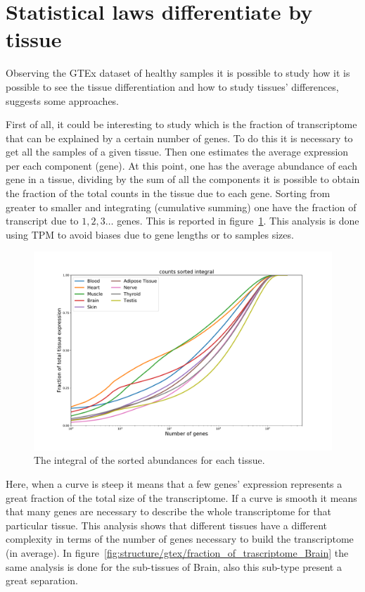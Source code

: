 \section{Statistical laws differentiate by tissue}
Observing the GTEx dataset of healthy samples it is possible to study how it is possible to see the tissue differentiation and how to study tissues' differences,~\cite{mele2014} suggests some approaches.

First of all, it could be interesting to study which is the fraction of transcriptome that can be explained by a certain number of genes.
To do this it is necessary to get all the samples of a given tissue. Then one estimates the average expression per each component (gene). At this point, one has the average abundance of each gene in a tissue, dividing by the sum of all the components it is possible to obtain the fraction of the total counts in the tissue due to each gene. Sorting from greater to smaller and integrating (cumulative summing) one have the fraction of transcript due to $1, 2, 3\dots$ genes. This is reported in figure~\ref{fig:structure/gtex/fraction_of_trascriptome}. This analysis is done using TPM to avoid biases due to gene lengths or to samples sizes.
\begin{figure}[htb!]
  \centering
  \includegraphics[width=0.7\linewidth]{pictures/structure/gtex/fraction_of_trascriptome.pdf}
  \caption{The integral of the sorted abundances for each tissue.}
  \label{fig:structure/gtex/fraction_of_trascriptome}
\end{figure}
Here, when a curve is steep it means that a few genes' expression represents a great fraction of the total size of the transcriptome. If a curve is smooth it means that many genes are necessary to describe the whole transcriptome for that particular tissue. This analysis shows that different tissues have a different complexity in terms of the number of genes necessary to build the transcriptome (in average). In figure~\ref{fig:structure/gtex/fraction_of_trascriptome_Brain} the same analysis is done for the sub-tissues of Brain, also this sub-type present a great separation.
